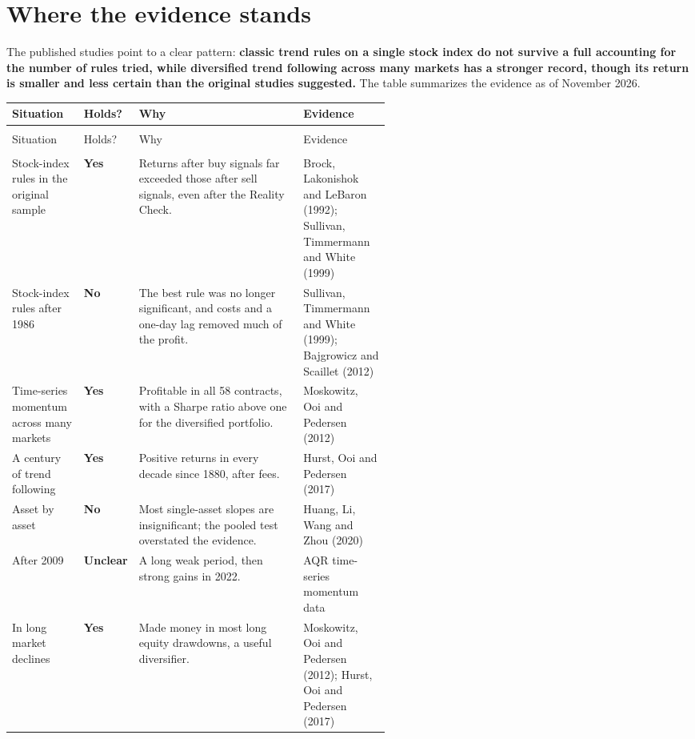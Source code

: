 \section{Where the evidence stands}
\label{sec:08-verdict}

The published studies point to a clear pattern: \textbf{classic trend rules on a single stock index do not survive a full accounting for the number of rules tried, while diversified trend following across many markets has a stronger record, though its return is smaller and less certain than the original studies suggested.} The table summarizes the evidence as of November 2026.

\begingroup
\small
\setlength{\LTpre}{6pt}\setlength{\LTpost}{6pt}
\begin{longtable}{@{}>{\raggedright\arraybackslash}p{0.19\linewidth}>{\raggedright\arraybackslash}p{0.13\linewidth}>{\raggedright\arraybackslash}p{}>{\raggedright\arraybackslash}p{0.23\linewidth}@{}}
\toprule
Situation & Holds? & Why & Evidence \\
\midrule
\endfirsthead
\multicolumn{4}{@{}l}{\emph{(continued)}} \\
\toprule
Situation & Holds? & Why & Evidence \\
\midrule
\endhead
\midrule
\multicolumn{4}{r@{}}{\emph{(continued on the next page)}} \\
\endfoot
\bottomrule
\endlastfoot
Stock-index rules in the original sample & \textbf{Yes} & Returns after buy signals far exceeded those after sell signals, even after the Reality Check. & Brock, Lakonishok and LeBaron (1992); Sullivan, Timmermann and White (1999) \\*
\addlinespace[3pt]
Stock-index rules after 1986 & \textbf{No} & The best rule was no longer significant, and costs and a one-day lag removed much of the profit. & Sullivan, Timmermann and White (1999); Bajgrowicz and Scaillet (2012) \\
\addlinespace[3pt]
Time-series momentum across many markets & \textbf{Yes} & Profitable in all 58 contracts, with a Sharpe ratio above one for the diversified portfolio. & Moskowitz, Ooi and Pedersen (2012) \\
\addlinespace[3pt]
A century of trend following & \textbf{Yes} & Positive returns in every decade since 1880, after fees. & Hurst, Ooi and Pedersen (2017) \\
\addlinespace[3pt]
Asset by asset & \textbf{No} & Most single-asset slopes are insignificant; the pooled test overstated the evidence. & Huang, Li, Wang and Zhou (2020) \\
\addlinespace[3pt]
After 2009 & \textbf{Unclear} & A long weak period, then strong gains in 2022. & AQR time-series momentum data \\*
\addlinespace[3pt]
In long market declines & \textbf{Yes} & Made money in most long equity drawdowns, a useful diversifier. & Moskowitz, Ooi and Pedersen (2012); Hurst, Ooi and Pedersen (2017) \\
\end{longtable}
\addtocounter{table}{-1}%
\endgroup

